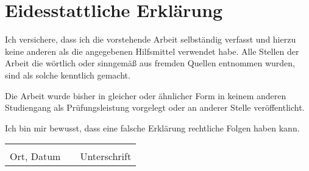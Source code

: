 
\newpage
\thispagestyle{empty}
\mbox{}


\chapter*{Eidesstattliche Erklärung}
	\thispagestyle{oath}
        \pagestyle{oath}

	Ich versichere, dass ich die vorstehende Arbeit selbständig verfasst und hierzu keine anderen als die angegebenen Hilfsmittel verwendet habe. Alle Stellen der Arbeit die wörtlich oder sinngemäß aus fremden Quellen entnommen wurden, sind als solche kenntlich gemacht.

	Die Arbeit wurde bisher in gleicher oder ähnlicher Form in keinem anderen Studiengang als Prüfungsleistung vorgelegt oder an anderer Stelle veröffentlicht.

	Ich bin mir bewusst, dass eine falsche Erklärung rechtliche Folgen haben kann.

 	\bigskip
 	\bigskip
 	\bigskip
 	\bigskip
 	\bigskip

\begin{tabular}{lp{2em}l}
   \hspace{5cm}   && \hspace{4cm} \\\cline{1-1}\cline{3-3}
   Ort, Datum     && Unterschrift
\end{tabular}

\cleardoubleemptypage
